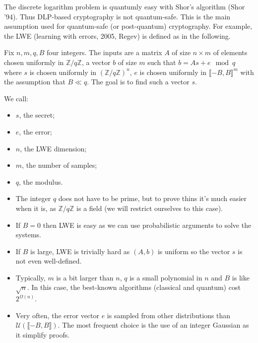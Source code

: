 \documentclass[./main]{subfiles}
\begin{document}
  The discrete logarithm problem is quantumly easy with Shor's algorithm (Shor '94).
  Thus DLP-based cryptography is not quantum-safe.
  This is the main assumption used for quantum-safe (or post-quantum) cryptography.
  For example, the LWE (learning with errors, 2005, Regev) is defined as in the following.

  \begin{defn}
    Fix $n, m, q, B$ four integers.
    The inputs are a matrix  $A$ of size $n \times m$ of elements chosen uniformly in $\mathds{Z} / q \mathds{Z}$, a vector $b$ of size $m$ such that $b = A s + e \mod q$ where $s$ is chosen uniformly in $(\mathds{Z} / q \mathds{Z})^n$, $e$ is chosen uniformly in $\llbracket {-B}, B\rrbracket^m$ with the assumption that $B \ll q$.
    The goal is to find such a vector $s$.

    We call:
    \begin{itemize}
      \item $s$, the secret;
      \item $e$, the error;
      \item $n$, the LWE dimension;
      \item $m$, the number of samples;
      \item $q$, the modulus.
    \end{itemize}
  \end{defn}

  \begin{rmk}
    \begin{itemize}
      \item The integer $q$ does not have to be prime, but to prove thins it's much easier when it is, as $\mathds{Z} /q \mathds{Z}$ is a field (we will restrict ourselves to this case).
      \item If $B = 0$ then LWE is easy as we can use probabilistic arguments to solve the systems.
      \item If $B$ is large, LWE is trivially hard as $(A, b)$ is uniform so the vector $s$ is not even well-defined.
      \item Typically, $m$ is a bit larger than $n$, $q$ is a small polynomial in $n$ and $B$ is like $\sqrt{n}$.
        In this case, the best-known  algorithms (classical and quantum) cost $2^{\Omega(n)}$.
      \item Very often, the error vector $e$ is sampled from other distributions than $\mathcal{U}(\llbracket {-B}, B\rrbracket)$.
        The most frequent choice is the use of an integer Gaussian as it simplify proofs.
    \end{itemize}
  \end{rmk}
\end{document}
